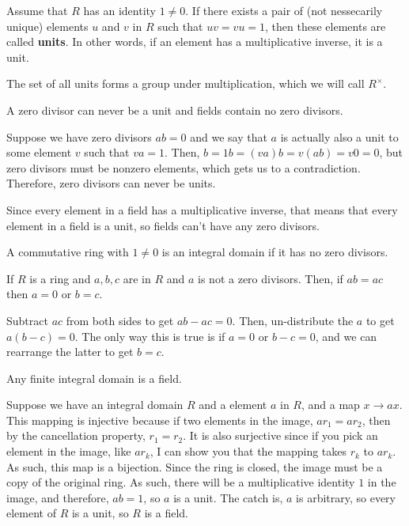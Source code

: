 \documentclass{article}
\begin{document}
\begin{definition}[Units]
Assume that $R$ has an identity $1\neq 0$. If there exists a pair of (not nessecarily unique) elements $u$ and $v$ in $R$ such that $uv = vu = 1$, then these elements are called \textbf{units}. In other words, if an element has a multiplicative inverse, it is a unit. 

The set of all units forms a group under multiplication, which we will call $R^\times$. 
\end{definition}

\begin{theorem}
A zero divisor can never be a unit and fields contain no zero divisors.
\end{theorem}

\begin{customproof}
Suppose we have zero divisors $ab = 0$ and we say that $a$ is actually also a unit to some element $v$ such that $va = 1$. Then, $b = 1b = (va)b = v(ab) = v0 = 0$, but zero divisors must be nonzero elements, which gets us to a contradiction. Therefore, zero divisors can never be units.

Since every element in a field has a multiplicative inverse, that means that every element in a field is a unit, so fields can't have any zero divisors. 
\end{customproof}

\begin{definition}
A commutative ring with $1\neq 0$ is an integral domain if it has no zero divisors.
\end{definition}

\begin{proposition}
If $R$ is a ring and $a, b, c$ are in $R$ and $a$ is not a zero divisors. Then, if $ab = ac$ then $a = 0$ or $b=c$. 
\end{proposition}

\begin{customproof}
Subtract $ac$ from both sides to get $ab-ac = 0$. Then, un-distribute the $a$ to get $a(b-c) = 0$. The only way this is true is if $a = 0$ or $b-c = 0$, and we can rearrange the latter to get $b=c$. 
\end{customproof}

\begin{corollary}
    Any finite integral domain is a field.
\end{corollary}

\begin{customproof}
Suppose we have an integral domain $R$ and a element $a$ in $R$, and a map $x \rightarrow ax$. This mapping is injective because if two elements in the image, $ar_1 = ar_2$, then by the cancellation property, $r_1 = r_2$. It is also surjective since if you pick an element in the image, like $ar_k$, I can show you that the mapping takes $r_k$ to $ar_k$. As such, this map is a bijection. Since the ring is closed, the image must be a copy of the original ring. As such, there will be a multiplicative identity $1$ in the image, and therefore, $ab = 1$, so $a$ is a unit. The catch is, $a$ is arbitrary, so every element of $R$ is a unit, so $R$ is a field. 
\end{customproof}
\end{document}
